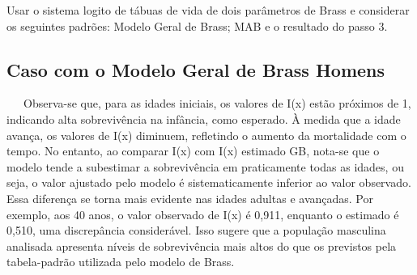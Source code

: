\documentclass[
  12pt,
  a4paper,
]{scrreprt}
\begin{document}
Usar o sistema logito de tábuas de vida de dois parâmetros de Brass e
considerar os seguintes padrões: Modelo Geral de Brass; MAB e o
resultado do passo 3.

\subsection{Caso com o Modelo Geral de Brass
Homens}\label{caso-com-o-modelo-geral-de-brass-homens}

~~~Observa-se que, para as idades iniciais, os valores de I(x) estão
próximos de 1, indicando alta sobrevivência na infância, como esperado.
À medida que a idade avança, os valores de I(x) diminuem, refletindo o
aumento da mortalidade com o tempo. No entanto, ao comparar I(x) com
I(x) estimado GB, nota-se que o modelo tende a subestimar a
sobrevivência em praticamente todas as idades, ou seja, o valor ajustado
pelo modelo é sistematicamente inferior ao valor observado. Essa
diferença se torna mais evidente nas idades adultas e avançadas. Por
exemplo, aos 40 anos, o valor observado de I(x) é 0,911, enquanto o
estimado é 0,510, uma discrepância considerável. Isso sugere que a
população masculina analisada apresenta níveis de sobrevivência mais
altos do que os previstos pela tabela-padrão utilizada pelo modelo de
Brass.
\end{document}
